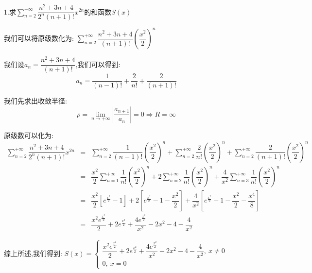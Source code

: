 1.求$\sum\limits_{n=2}^{+\infty}\dfrac{n^2+3n+4}{2^n(n+1)!}x^{2n}$的和函数$S(x)$
\begin{solution}

	我们可以将原级数化为:  $\sum\limits_{n=2}^{+\infty}\dfrac{n^2+3n+4}{(n+1)!}(\dfrac{x^2}{2})^{n}$
	
	我们设$a_{n}=\dfrac{n^2+3n+4}{(n+1)!}$,我们可以得到:  
	$$a_{n}=\dfrac{1}{(n-1)!}+\dfrac{2}{n!}+\dfrac{2}{(n+1)!}$$
	
	我们先求出收敛半径:  
	$$\rho=\lim\limits_{n\to +\infty}|\dfrac{a_{n+1}}{a_{n}}|=0\Rightarrow R=\infty$$
	
	原级数可以化为:  
	\begin{eqnarray*}
		\sum\limits_{n=2}^{+\infty}\dfrac{n^2+3n+4}{2^n(n+1)!}x^{2n}&=&\sum\limits_{n=2}^{+\infty}\dfrac{1}{(n-1)!}(\dfrac{x^2}{2})^{n}+\sum\limits_{n=2}^{+\infty}\dfrac{2}{n!}(\dfrac{x^2}{2})^{n}+\sum\limits_{n=2}^{+\infty}\dfrac{2}{(n+1)!}(\dfrac{x^2}{2})^{n}\\
		&=&\dfrac{x^2}{2}\sum\limits_{n=1}^{+\infty}\dfrac{1}{n!}(\dfrac{x^2}{2})^{n}+2\sum\limits_{n=2}^{+\infty}\dfrac{1}{n!}(\dfrac{x^2}{2})^{n}+\dfrac{4}{x^2}\sum\limits_{n=3}^{+\infty}\dfrac{1}{n!}(\dfrac{x^2}{2})^{n}\\
		&=&\dfrac{x^2}{2}\left[e^{\frac{x^2}{2}}-1\right]+2\left[e^{\frac{x^2}{2}}-1-\dfrac{x^2}{2}\right]+\dfrac{4}{x^2}\left[ e^{\frac{x^2}{2}}-1-\dfrac{x^2}{2}-\dfrac{x^4}{8}\right]\\
		&=&\dfrac{x^2e^{\frac{x^2}{2}}}{2}+2e^{\frac{x^2}{2}}+\dfrac{4e^{\frac{x^2}{2}}}{x^2}-2x^2-4-\dfrac{4}{x^2}   
	\end{eqnarray*}

	综上所述,我们得到:  $S(x)=\left\lbrace
	\begin{array}{l}
		\dfrac{x^2e^{\frac{x^2}{2}}}{2}+2e^{\frac{x^2}{2}}+\dfrac{4e^{\frac{x^2}{2}}}{x^2}-2x^2-4-\dfrac{4}{x^2},\ x\neq 0\\
		0,\ x=0
	\end{array}
	\right. $
\end{solution}

